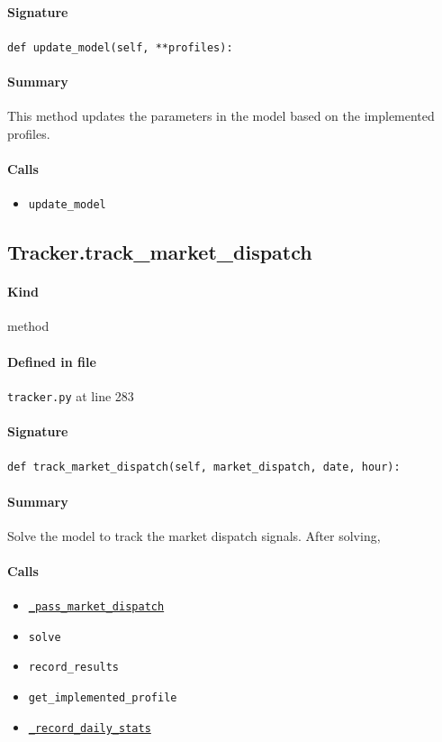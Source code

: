 \documentclass[11pt]{report}
\begin{document}
\paragraph{Signature} \texttt{def update\_model(self, **profiles):}
\paragraph{Summary} This method updates the parameters in the model based on the implemented profiles.
\paragraph{Calls}
\begin{itemize}[leftmargin=*]
  \item \texttt{update\_model}
\end{itemize}
\subsection{Tracker.track\_market\_dispatch}
\label{def:tracker.py:Tracker.track_market_dispatch:L283}
\paragraph{Kind} method
\paragraph{Defined in file} \texttt{tracker.py} at line 283
\paragraph{Signature} \texttt{def track\_market\_dispatch(self, market\_dispatch, date, hour):}
\paragraph{Summary} Solve the model to track the market dispatch signals. After solving,
\paragraph{Calls}
\begin{itemize}[leftmargin=*]
  \item \hyperref[def:tracker.py:Tracker._pass_market_dispatch:L338]{\texttt{\_pass\_market\_dispatch}}
  \item \texttt{solve}
  \item \texttt{record\_results}
  \item \texttt{get\_implemented\_profile}
  \item \hyperref[def:tracker.py:Tracker._record_daily_stats:L315]{\texttt{\_record\_daily\_stats}}
\end{itemize}
\end{document}

